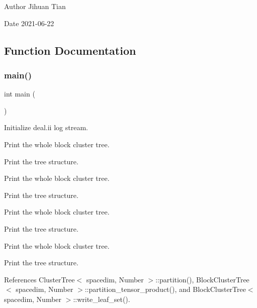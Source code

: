 \begin{DoxyAuthor}{Author}
Jihuan Tian 
\end{DoxyAuthor}
\begin{DoxyDate}{Date}
2021-\/06-\/22 
\end{DoxyDate}


\subsection{Function Documentation}
\mbox{\label{block-cluster-tree-hp_8cc_ae66f6b31b5ad750f1fe042a706a4e3d4}} 
\subsubsection{\texorpdfstring{main()}{main()}}
{\footnotesize\ttfamily int main (\begin{DoxyParamCaption}{ }\end{DoxyParamCaption})}

Initialize deal.\+ii log stream.

Print the whole block cluster tree.

Print the tree structure.

Print the whole block cluster tree.

Print the tree structure.

Print the whole block cluster tree.

Print the tree structure.

Print the whole block cluster tree.

Print the tree structure.

References Cluster\+Tree$<$ spacedim, Number $>$\+::partition(), Block\+Cluster\+Tree$<$ spacedim, Number $>$\+::partition\+\_\+tensor\+\_\+product(), and Block\+Cluster\+Tree$<$ spacedim, Number $>$\+::write\+\_\+leaf\+\_\+set().


